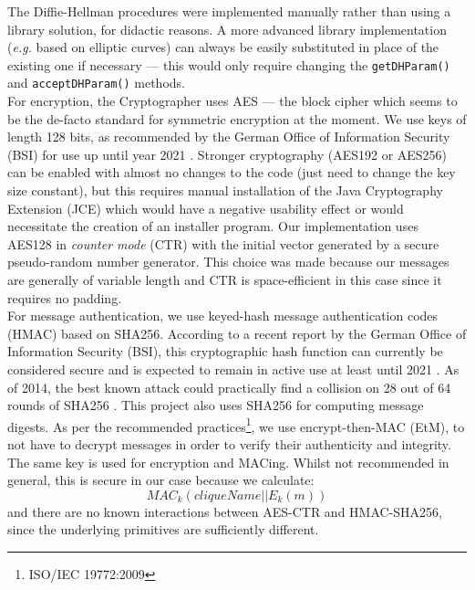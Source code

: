 \documentclass[a4paper, 12pt]{report}
\begin{document}
The Diffie-Hellman procedures were implemented manually rather than using a library solution, for didactic reasons. A more advanced library implementation (\textit{e.g.} based on elliptic curves) can always be easily substituted in place of the existing one if necessary --- this would only require changing the \texttt{getDHParam()} and \texttt{acceptDHParam()} methods. \\ 

For encryption, the Cryptographer uses AES --- the block cipher which seems to be the de-facto standard for symmetric encryption at the moment. We use keys of length 128 bits, as recommended by the German Office of Information Security (BSI) for use up until year 2021 \cite{margraf2016kryptographische}. Stronger cryptography (AES192 or AES256) can be enabled with almost no changes to the code (just need to change the key size constant), but this requires manual installation of the Java Cryptography Extension (JCE) which would have a negative usability effect or would necessitate the creation of an installer program. Our implementation uses AES128 in \emph{counter mode} (CTR) with the initial vector generated by a secure pseudo-random number generator. This choice was made because our messages are generally of variable length and CTR is space-efficient in this case since it requires no padding. \\

For message authentication, we use keyed-hash message authentication codes (HMAC) based on SHA256. According to a recent report by the German Office of Information Security (BSI), this cryptographic hash function can currently be considered secure and is expected to remain in active use at least until 2021 \cite{margraf2016kryptographische}. As of 2014, the best known attack could practically find a collision on 28 out of 64 rounds of SHA256 \cite{dobraunig2014analysis}. This project also uses SHA256 for computing message digests. As per the recommended practices\footnote{ISO/IEC 19772:2009}, we use encrypt-then-MAC (EtM), to not have to decrypt messages in order to verify their authenticity and integrity. \\

The same key is used for encryption and MACing. Whilst not recommended in general, this is secure in our case because we calculate:
\begin{equation*}
    MAC_k(cliqueName||E_k(m))
\end{equation*}
and there are no known interactions between AES-CTR and HMAC-SHA256, since the underlying primitives are sufficiently different.
\end{document}

